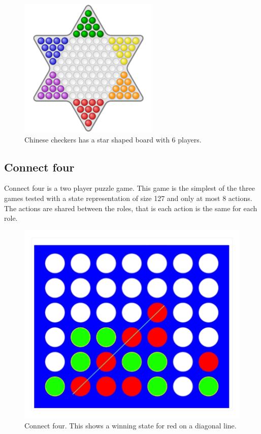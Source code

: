 \documentclass[twocolumn, letterpaper, 10 pt, conference]{ieeeconf}  %
\begin{document}
    \begin{figure}[H]
        \centering
        \includegraphics[scale=0.8]{Images/chinese_checkers.png}
        \caption{Chinese checkers has a star shaped board with 6 players.}
        \label{fig:single_role_model}
    \end{figure}
    
    \subsection{Connect four}
    Connect four is a two player puzzle game. This game is the simplest of the three games tested with a state representation of size 127 and only at most 8 actions. The actions are shared between the roles, that is each action is the same for each role. 
    
    \begin{figure}[H]
        \centering
        \includegraphics[scale=0.7]{Images/connect4.png}
        \caption{Connect four. This shows a winning state for red on a diagonal line.}
        \label{fig:single_role_model}
    \end{figure}
    
\end{document}
